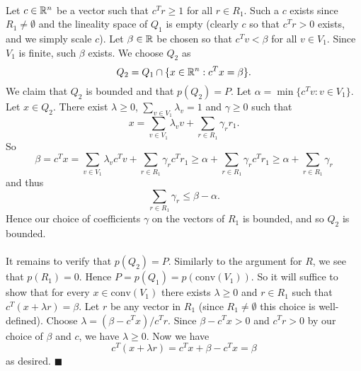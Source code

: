 \documentclass[letterpaper,12pt,oneside,onecolumn]{article}
\newcommand{\conv}[1]{\ensuremath{\text{conv}(#1) }}
\begin{document}
\paragraph{}
Let $c \in \mathbb{R}^n$ be a vector such that $c^Tr \geq 1$ for all $r \in R_1$. Such a $c$ exists since $R_1 \neq \emptyset$ and the lineality space of $Q_1$ is empty (clearly $c$ so that $c^Tr >0$ exists, and we simply scale $c$). Let $\beta \in \mathbb{R}$ be chosen so that $c^Tv < \beta$ for all $v \in V_1$. Since $V_1$ is finite, such $\beta$ exists. We choose $Q_2$ as
$$Q_2 = Q_1 \cap \{x \in \mathbb{R}^n : c^Tx = \beta\}.$$
We claim that $Q_2$ is bounded and that $p(Q_2) = P$. Let $\alpha = \min\{c^Tv : v \in V_1\}$. Let $x \in Q_2$. There exist $\lambda \geq 0$, $\sum_{v \in V_1} \lambda_v = 1$ and $\gamma \geq 0$ such that
$$x = \sum_{v \in V_1} \lambda_v v + \sum_{r \in R_1} \gamma_r r_1.$$
So
$$\beta = c^Tx =  \sum_{v \in V_1} \lambda_v c^Tv + \sum_{r \in R_1} \gamma_r c^Tr_1 \geq \alpha + \sum_{r \in R_1} \gamma_r c^Tr_1\geq \alpha + \sum_{r \in R_1} \gamma_r$$
and thus $$\sum_{r \in R_1} \gamma_r \leq \beta -\alpha.$$
Hence our choice of coefficients $\gamma$ on the vectors of $R_1$ is bounded, and so $Q_2$ is bounded.
\paragraph{}
It remains to verify that $p(Q_2) = P$. Similarly to the argument for $R$, we see that $p(R_1) = 0$. Hence $P = p(Q_1) = p(\conv{V_1}).$ So it will suffice to show that for every $x \in \conv{V_1}$ there exists $\lambda \geq 0$ and $r \in R_1$ such that $c^T(x + \lambda r) = \beta.$ Let $r$ be any vector in $R_1$ (since $R_1 \neq \emptyset$ this choice is well-defined). Choose $\lambda = (\beta - c^Tx)/c^Tr$. Since $\beta-c^Tx >0$ and $c^Tr >0$ by our choice of $\beta$ and $c$, we have $\lambda \geq 0$. Now we have
$$c^T(x + \lambda r) = c^Tx + \beta - c^Tx = \beta$$
as desired. $\blacksquare$
\section{}
\paragraph{}

\section{}
\paragraph{}

\section{}
\paragraph{}
\end{document}
